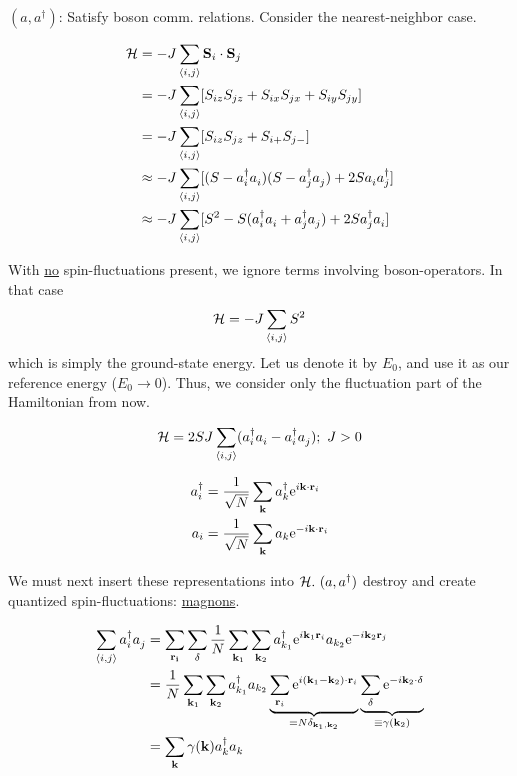 $(a, a^\dagger)$: Satisfy boson comm. relations. Consider the nearest-neighbor case.

\begin{align}
	\mathcal{H} &= -J\sum_{\langle i,j \rangle} \vb{S}_i\cdot\vb{S}_j \\
	&= -J\sum_{\langle i, j \rangle}[S_{iz}S_{jz} + S_{ix}S_{jx} + S_{iy}S_{jy}]\\
	&= -J\sum_{\langle i, j \rangle}[S_{iz}S_{jz} + S_{i+}S_{j-}] \\
	&\approx -J\sum_{\langle i, j \rangle}[(S-a_i^\dagger a_i^{})(S-a_j^\dagger a_j^{}) + 2S a_i^{} a_j^\dagger]\\
	&\approx -J\sum_{\langle i, j \rangle}[S^2 - S(a_i^\dagger a_i^{} + a_j^\dagger a_j^{}) + 2S a_j^\dagger a_i^{}]
\end{align}

With \uline{no} spin-fluctuations present, we ignore terms involving boson-operators. In that case 
\begin{equation}
	\mathcal{H} = -J \sum_{\langle i, j \rangle} S^2
\end{equation}
which is simply the ground-state energy. Let us denote it by $E_0$, and use it as our reference energy ($E_0 \rightarrow 0$). Thus, we consider only the fluctuation part of the Hamiltonian from now.

\begin{equation}
	\mathcal{H} = 2SJ\sum_{\langle i, j \rangle} (a_i^\dagger a_i^{} - a_i^\dagger a_j^{}); \ J > 0
\end{equation}

\begin{align}
	a_i^\dagger &= \frac{1}{\sqrt{N}}\sum_{\vb{k}}a_k^\dagger \mathrm{e}^{i\vb{k}\cdot\vb{r}_i} \\
	a_i &= \frac{1}{\sqrt{N}}\sum_{\vb{k}}a_k \mathrm{e}^{-i\vb{k}\cdot\vb{r}_i}
\end{align}

We must next insert these representations into $\mathcal{H}. \ (a, a^\dagger)$ destroy and create quantized spin-fluctuations: \uline{magnons}.

\begin{align}
	\sum_{\langle i, j \rangle} a_i^\dagger a_j^{}
	&= \sum_{\vb{r_i}}\sum_{\vb{\delta}} \frac{1}{N}\sum_{\vb{k}_1}\sum_{\vb{k}_2}a_{k_1}^\dagger \mathrm{e}^{i\vb{k}_1\vb{r}_i} a_{k_2} \mathrm{e}^{-i\vb{k}_2\vb{r}_j} \\
	&= \frac{1}{N}\sum_{\vb{k}_1}\sum_{\vb{k}_2}a_{k_1}^\dagger a_{k_2} \underbrace{\sum_{\vb{r}_i}\mathrm{e}^{i(\vb{k}_1 - \vb{k}_2)\cdot\vb{r}_i}}_{= N \delta_{\vb{k}_1, \vb{k}_2}} \underbrace{\sum_{\vb{\delta}}\mathrm{e}^{-i\vb{k}_2\cdot \vb{\delta}}}_{\equiv\gamma(\vb{k}_2)} \\
	&= \sum_{\vb{k}}\gamma(\vb{k})a_k^\dagger a_k^{}
\end{align}

